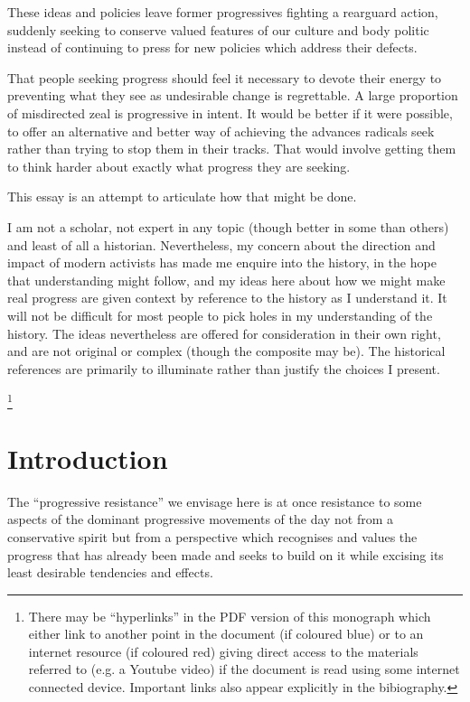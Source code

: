 \documentclass[10pt,titlepage]{article}
\begin{document}
These ideas and policies leave former progressives fighting a rearguard action, suddenly seeking to conserve valued features of our culture and body politic instead of continuing to press for new policies which address their defects.

That people seeking progress should feel it necessary to devote their energy to preventing what they see as undesirable change is regrettable.
A large proportion of misdirected zeal is progressive in intent.
It would be better if it were possible, to offer an alternative and better way of achieving the advances radicals seek rather than trying to stop them in their tracks.
That would involve getting them to think harder about exactly what progress they are seeking.

This essay is an attempt to articulate how that might be done.

I am not a scholar, not expert in any topic (though better in some than others) and least of all a historian.
Nevertheless, my concern about the direction and impact of modern activists has made me enquire into the history, in the hope that understanding might follow, and my ideas here about how we might make real progress are given context by reference to the history as I understand it.
It will not be difficult for most people to pick holes in my understanding of the history.
The ideas nevertheless are offered for consideration in their own right, and are not original or complex (though the composite may be).
The historical references are primarily to illuminate rather than justify the choices I present.



\footnote{There may be ``hyperlinks'' in the PDF version of this monograph which either link to another point in the document  (if coloured blue) or to an internet resource  (if coloured red) giving direct access to the materials referred to (e.g. a Youtube video) if the document is read using some internet connected device.
Important links also appear explicitly in the bibiography.}

\section{Introduction}

The ``progressive resistance'' we envisage here is at once resistance to some aspects of the dominant progressive movements of the day not from a conservative spirit but from a perspective which recognises and values the progress that has already been made and seeks to build on it while excising its least desirable tendencies and effects.
\end{document}
